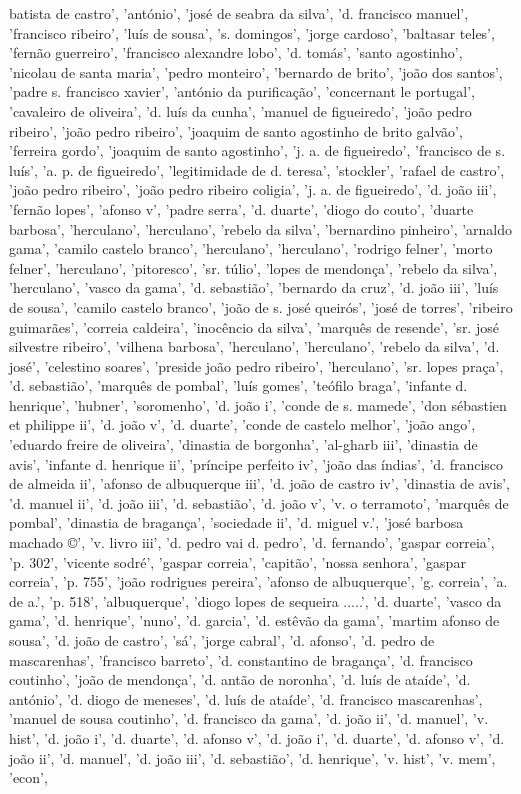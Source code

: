 \documentclass{article}
\begin{document}
\begin{itemize}
batista de castro', 'antónio', 'josé de seabra da silva', 'd. francisco manuel', 'francisco ribeiro', 'luís de sousa', 's. domingos', 'jorge cardoso', 'baltasar teles', 'fernão guerreiro', 'francisco alexandre lobo', 'd. tomás', 'santo agostinho', 'nicolau de santa maria', 'pedro monteiro', 'bernardo de brito', 'joão dos santos', 'padre s. francisco xavier', 'antónio da purificação', 'concernant le portugal', 'cavaleiro de oliveira', 'd. luís da cunha', 'manuel de figueiredo', 'joão pedro ribeiro', 'joão pedro ribeiro', 'joaquim de santo agostinho de brito galvão', 'ferreira gordo', 'joaquim de santo agostinho', 'j. a. de figueiredo', 'francisco de s. luís', 'a. p. de figueiredo', 'legitimidade de d. teresa', 'stockler', 'rafael de castro', 'joão pedro ribeiro', 'joão pedro ribeiro coligia', 'j. a. de figueiredo', 'd. joão iii', 'fernão lopes', 'afonso v', 'padre serra', 'd. duarte', 'diogo do couto', 'duarte barbosa', 'herculano', 'herculano', 'rebelo da silva', 'bernardino pinheiro', 'arnaldo gama', 'camilo castelo branco', 'herculano', 'herculano', 'rodrigo felner', 'morto felner', 'herculano', 'pitoresco', 'sr. túlio', 'lopes de mendonça', 'rebelo da silva', 'herculano', 'vasco da gama', 'd. sebastião', 'bernardo da cruz', 'd. joão iii', 'luís de sousa', 'camilo castelo branco', 'joão de s. josé queirós', 'josé de torres', 'ribeiro guimarães', 'correia caldeira', 'inocêncio da silva', 'marquês de resende', 'sr. josé silvestre ribeiro', 'vilhena barbosa', 'herculano', 'herculano', 'rebelo da silva', 'd. josé', 'celestino soares', 'preside joão pedro ribeiro', 'herculano', 'sr. lopes praça', 'd. sebastião', 'marquês de pombal', 'luís gomes', 'teófilo braga', 'infante d. henrique', 'hubner', 'soromenho', 'd. joão i', 'conde de s. mamede', 'don sébastien et philippe ii', 'd. joão v', 'd. duarte', 'conde de castelo melhor', 'joão ango', 'eduardo freire de oliveira', 'dinastia de borgonha', 'al-gharb iii', 'dinastia de avis', 'infante d. henrique ii', 'príncipe perfeito iv', 'joão das índias', 'd. francisco de almeida ii', 'afonso de albuquerque iii', 'd. joão de castro iv', 'dinastia de avis', 'd. manuel ii', 'd. joão iii', 'd. sebastião', 'd. joão v', 'v. o terramoto', 'marquês de pombal', 'dinastia de bragança', 'sociedade ii', 'd. miguel v.', 'josé barbosa machado ©', 'v. livro iii', 'd. pedro vai d. pedro', 'd. fernando', 'gaspar correia', 'p. 302', 'vicente sodré', 'gaspar correia', 'capitão', 'nossa senhora', 'gaspar correia', 'p. 755', 'joão rodrigues pereira', 'afonso de albuquerque', 'g. correia', 'a. de a.', 'p. 518', 'albuquerque', 'diogo lopes de sequeira .....', 'd. duarte', 'vasco da gama', 'd. henrique', 'nuno', 'd. garcia', 'd. estêvão da gama', 'martim afonso de sousa', 'd. joão de castro', 'sá', 'jorge cabral', 'd. afonso', 'd. pedro de mascarenhas', 'francisco barreto', 'd. constantino de bragança', 'd. francisco coutinho', 'joão de mendonça', 'd. antão de noronha', 'd. luís de ataíde', 'd. antónio', 'd. diogo de meneses', 'd. luís de ataíde', 'd. francisco mascarenhas', 'manuel de sousa coutinho', 'd. francisco da gama', 'd. joão ii', 'd. manuel', 'v. hist', 'd. joão i', 'd. duarte', 'd. afonso v', 'd. joão i', 'd. duarte', 'd. afonso v', 'd. joão ii', 'd. manuel', 'd. joão iii', 'd. sebastião', 'd. henrique', 'v. hist', 'v. mem', 'econ', 
\end{itemize}
\end{document}

